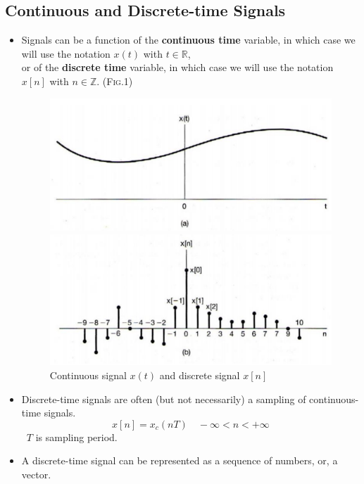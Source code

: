 \documentclass[12pt,a4paper]{article}
\begin{document}
\subsection{Continuous and Discrete-time Signals}
 \begin{itemize}
 \item Signals can be a function of the \textbf{continuous time} variable, in which case we will use the notation $x(t)$ with $t \in \mathbb{R}$, \\
or of the \textbf{discrete time} variable, in which case we will use the notation $x[n]$ with $n \in \mathbb{Z}$. (\textsc{Fig.1})

 
 \begin{figure}[H]
 \begin{minipage}{0.5\textwidth}
  \includegraphics[width = \textwidth]{images/continuous_signals}
  \end{minipage} \hfill
  \begin{minipage}{0.5\textwidth}
  \includegraphics[width=\textwidth]{images/discrete_signals}
  \end{minipage}
  \caption{Continuous signal $x(t)$ and discrete signal $x[n]$ }
 \end{figure}
 
 \item Discrete-time signals are often (but not necessarily) a sampling of continuous-time signals.
 \[ x[n] = x_{c}(nT) \quad -\infty < n < +\infty \]
 \ $T$ is sampling period.
 \item A discrete-time signal can be represented as a sequence of numbers, or, a vector.
 \end{itemize}
\end{document}
